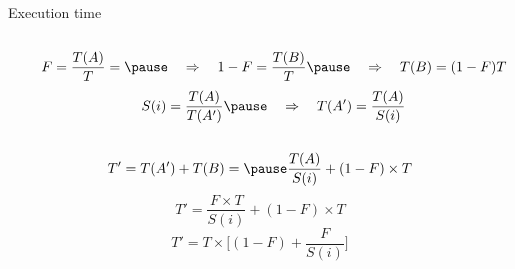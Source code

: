 \begin{frame}[t]{Execution time}
\begin{columns}[T]
\begin{column}{0.35\textwidth}
\end{column}
\pause
\begin{column}{.65\textwidth}
\begin{small}
\begin{displaymath}
F=\frac{T(A)}{T} =\pause
\quad \Rightarrow \quad 1 - F = \frac{T(B)}{T} \pause
\quad \Rightarrow \quad T(B) = (1 - F) T 
\end{displaymath}
\pause
\begin{displaymath}
S(i)=\frac{T(A)}{T(A')} \pause
\quad \Rightarrow \quad T(A') = \frac{T(A)}{S(i)}
\end{displaymath}
\end{small}
\end{column}
\end{columns}

\pause
\begin{small}
\begin{displaymath}
T'=T(A')+T(B)= \pause
\frac{T(A)}{S(i)}+(1-F) \times T
\end{displaymath}
\pause
\begin{displaymath}
T'=\frac{F \times T}{S(i)} + (1-F) \times T
\end{displaymath}
\pause
\begin{displaymath}
T'=T \times \Big[ (1 - F) + \frac{F}{S(i)} \Big]
\end{displaymath}
\end{small}
\end{frame}

